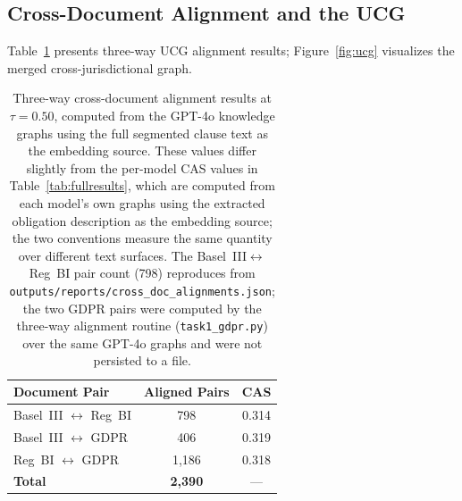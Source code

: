 \documentclass{article}
\begin{document}
\subsection{Cross-Document Alignment and the UCG}

Table~\ref{tab:ucg} presents three-way UCG alignment results;
Figure~\ref{fig:ucg} visualizes the merged cross-jurisdictional graph.

\begin{table}[!htbp]
\caption{Three-way cross-document alignment results at $\tau = 0.50$,
computed from the GPT-4o knowledge graphs using the full segmented
clause text as the embedding source. These values differ slightly from
the per-model CAS values in Table~\ref{tab:fullresults}, which are
computed from each model's own graphs using the extracted obligation
description as the embedding source; the two conventions measure the
same quantity over different text surfaces. The Basel~III$\leftrightarrow$Reg~BI
pair count (798) reproduces from \texttt{outputs/reports/cross\_doc\_alignments.json};
the two GDPR pairs were computed by the three-way alignment routine
(\texttt{task1\_gdpr.py}) over the same GPT-4o graphs and were not
persisted to a file.}
\centering
\begin{tabular}{lcc}
\toprule
Document Pair & Aligned Pairs & CAS \\
\midrule
Basel~III $\leftrightarrow$ Reg~BI   & \phantom{0,}798 & 0.314 \\
Basel~III $\leftrightarrow$ GDPR     & \phantom{0,}406 & 0.319 \\
Reg~BI    $\leftrightarrow$ GDPR     &           1,186 & 0.318 \\
\midrule
\textbf{Total}                        & \textbf{2,390}  & ---   \\
\bottomrule
\end{tabular}
\label{tab:ucg}
\end{table}
\end{document}
